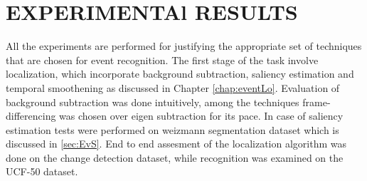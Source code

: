 \chapter{EXPERIMENTAl RESULTS}
All the experiments are performed for justifying the appropriate set of techniques that are chosen for event recognition. The first stage of the task involve localization, which incorporate background subtraction, saliency estimation and temporal smoothening as discussed in Chapter \ref{chap:eventLo}. Evaluation of background subtraction was done intuitively, among the techniques frame-differencing was chosen over eigen subtraction for its pace. In case of saliency estimation tests were performed on weizmann segmentation dataset which is discussed in \ref{sec:EvS}. End to end assesment of the localization algorithm was done on the change detection dataset, while recognition was examined on the UCF-50 dataset.

